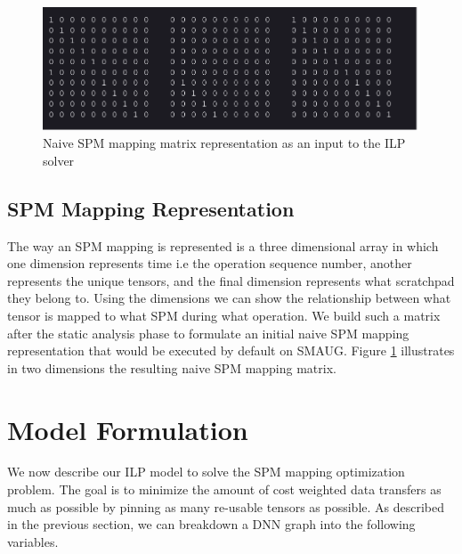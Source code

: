 \begin{figure}[thb!]
\centering
\includegraphics[scale=0.5]{Figures/naive_matrix_mapping.png}
\decoRule
\caption[2D Tensor Mapping Matrix]{Naive SPM mapping matrix representation as an input to the ILP solver}
\label{fig:naiveSPM2D}
\end{figure}

\subsection{SPM Mapping Representation}

The way an SPM mapping is represented is a three dimensional array in which one
dimension represents time i.e the operation sequence number, another represents
the unique tensors, and the final dimension represents what scratchpad they
belong to. Using the dimensions we can show the relationship between what tensor
is mapped to what SPM during what operation. We build such a matrix after the
static analysis phase to formulate an initial naive SPM mapping representation
that would be executed by default on SMAUG. Figure \ref{fig:naiveSPM2D}
illustrates in two dimensions the resulting naive SPM mapping matrix.

\section{Model Formulation}

We now describe our ILP model to solve the SPM mapping optimization problem. The goal is to minimize
the amount of cost weighted data transfers as much as possible by pinning as many re-usable tensors
as possible. As described in the previous section, we can breakdown a DNN graph into the following variables.

